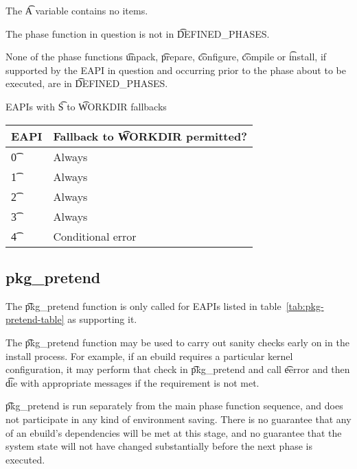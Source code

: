 \begin{compactitem}
\item The \t{A} variable contains no items.
\item The phase function in question is not in \t{DEFINED\_PHASES}.
\item None of the phase functions \t{unpack}, \t{prepare}, \t{configure}, \t{compile} or \t{install},
    if supported by the EAPI in question and occurring prior to the phase about to be executed, are
    in \t{DEFINED\_PHASES}.
\end{compactitem}

\begin{centertable}{EAPIs with \t{S} to \t{WORKDIR} fallbacks} \label{tab:s-fallback-table}
    \begin{tabular}{ l l }
        \toprule
        \multicolumn{1}{c}{\textbf{EAPI}} &
        \multicolumn{1}{c}{\textbf{Fallback to \t{WORKDIR} permitted?}} \\
        \midrule
    \t{0} & Always \\
    \t{1} & Always \\
    \t{2} & Always \\
    \t{3} & Always \\
    \t{4} & Conditional error \\
    \bottomrule
    \end{tabular}
\end{centertable}

\subsection{pkg\_pretend}
\label{sec:pkg-pretend-function}

 The \t{pkg\_pretend} function is only called for EAPIs listed in
table~\ref{tab:pkg-pretend-table} as supporting it.

The \t{pkg\_pretend} function may be used to carry out sanity checks early on in the install
process. For example, if an ebuild requires a particular kernel configuration, it may perform that
check in \t{pkg\_pretend} and call \t{eerror} and then \t{die} with appropriate messages if the
requirement is not met.

\t{pkg\_pretend} is run separately from the main phase function sequence, and does not participate
in any kind of environment saving. There is no guarantee that any of an ebuild's dependencies will
be met at this stage, and no guarantee that the system state will not have changed substantially
before the next phase is executed.

